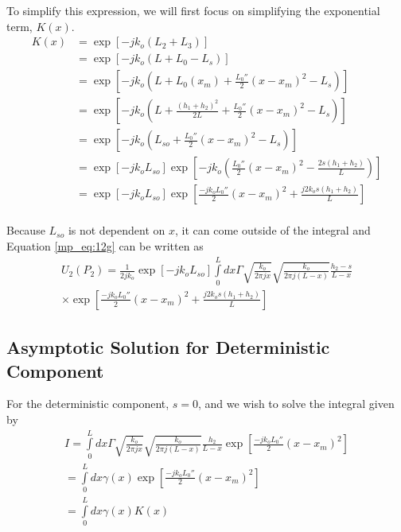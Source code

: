 To simplify this expression, we will first focus on simplifying the exponential term, $K(x)$.
\begin{equation}
\begin{aligned}
K(x)&= \exp\left[-jk_o\left( L_2 + L_3\right) \right] \\
&= \exp\left[-jk_o\left( L+L_0-L_s\right) \right]\\
&= \exp\left[-jk_o\left( L+L_0(x_m) + \frac{L_0''}{2}(x-x_m)^2-L_s\right) \right]\\
&= \exp\left[-jk_o\left( L+\frac{(h_1+h_2)^2}{2L} + \frac{L_0''}{2}(x-x_m)^2-L_s\right)\right]\\
&=\exp\left[-jk_o\left(L_{so}+\frac{L_0''}{2}(x-x_m)^2-L_s\right)\right]\\
&=\exp\left[-jk_oL_{so}\right]\exp\left[-jk_o\left(\frac{L_0''}{2}(x-x_m)^2-\frac{2s(h_1+h_2)}{L}\right)\right]\\
&=\exp\left[-jk_oL_{so}\right]\exp\left[\frac{-jk_oL_0''}{2}(x-x_m)^2+\frac{j2k_os(h_1+h_2)}{L}\right]\\
\label{mp_eq:12i}
\end{aligned}
\end{equation}
\renewcommand{\baselinestretch}{2} \small\normalsize

Because $L_{so}$ is not dependent on $x$, it can come outside of the integral and Equation \ref{mp_eq:12g} can be written as
\begin{equation}
\begin{gathered}
U_2(P_2)= \frac{1}{2jk_o}\exp\left[-jk_oL_{so}\right]\int\limits_{0}^{L}dx\Gamma \sqrt{\frac{k_o}{2\pi jx}}\sqrt{\frac{k_o}{2\pi j (L-x)}}\frac{h_2-s}{L-x}\\ \times\exp\left[\frac{-jk_oL_0''}{2}(x-x_m)^2+\frac{j2k_os(h_1+h_2)}{L}\right]
\label{mp_eq:21}
\end{gathered}
\end{equation}
\renewcommand{\baselinestretch}{2} \small\normalsize

\subsection{Asymptotic Solution for Deterministic Component}
For the deterministic component, $s = 0$, and we wish to solve the integral given by
\begin{equation}
\begin{gathered}
I = \int\limits_{0}^{L}dx\Gamma \sqrt{\frac{k_o}{2\pi jx}}\sqrt{\frac{k_o}{2\pi j (L-x)}}\frac{h_2}{L-x}\exp\left[\frac{-jk_oL_0''}{2}(x-x_m)^2\right] \\
= \int\limits_{0}^{L}dx\gamma(x)\exp\left[\frac{-jk_oL_0''}{2}(x-x_m)^2\right] \\
= \int\limits_{0}^{L}dx\gamma(x)K(x) 
\end{gathered}
\label{mp_eq:22}
\end{equation}

